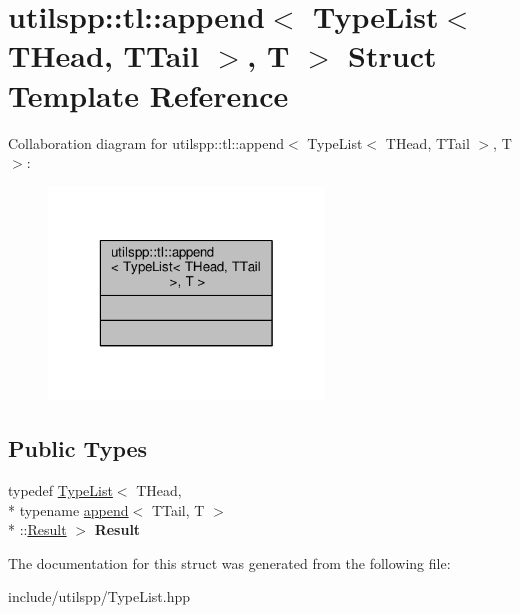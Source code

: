 \hypertarget{structutilspp_1_1tl_1_1append_3_01TypeList_3_01THead_00_01TTail_01_4_00_01T_01_4}{\section{utilspp\-:\-:tl\-:\-:append$<$ Type\-List$<$ T\-Head, T\-Tail $>$, T $>$ Struct Template Reference}
\label{structutilspp_1_1tl_1_1append_3_01TypeList_3_01THead_00_01TTail_01_4_00_01T_01_4}
}


Collaboration diagram for utilspp\-:\-:tl\-:\-:append$<$ Type\-List$<$ T\-Head, T\-Tail $>$, T $>$\-:
\nopagebreak
\begin{figure}[H]
\begin{center}
\leavevmode
\includegraphics[width=208pt]{structutilspp_1_1tl_1_1append_3_01TypeList_3_01THead_00_01TTail_01_4_00_01T_01_4__coll__graph}
\end{center}
\end{figure}
\subsection*{Public Types}
\begin{DoxyCompactItemize}
\item 
\hypertarget{structutilspp_1_1tl_1_1append_3_01TypeList_3_01THead_00_01TTail_01_4_00_01T_01_4_af85ba63843e47eebcf0af6feeda0d295}{typedef \hyperlink{structutilspp_1_1tl_1_1TypeList}{Type\-List}$<$ T\-Head, \\*
typename \hyperlink{structutilspp_1_1tl_1_1append}{append}$<$ T\-Tail, T $>$\\*
\-::\hyperlink{structutilspp_1_1tl_1_1TypeList}{Result} $>$ {\bfseries Result}}\label{structutilspp_1_1tl_1_1append_3_01TypeList_3_01THead_00_01TTail_01_4_00_01T_01_4_af85ba63843e47eebcf0af6feeda0d295}

\end{DoxyCompactItemize}


The documentation for this struct was generated from the following file\-:\begin{DoxyCompactItemize}
\item 
include/utilspp/Type\-List.\-hpp\end{DoxyCompactItemize}
